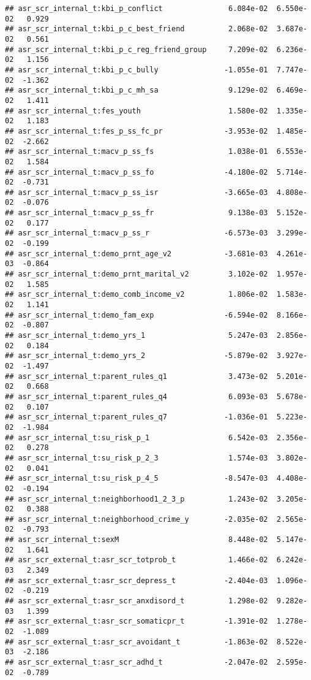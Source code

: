 \documentclass[
]{article}
\begin{document}
\begin{verbatim}
## asr_scr_internal_t:kbi_p_conflict               6.084e-02  6.550e-02   0.929
## asr_scr_internal_t:kbi_p_c_best_friend          2.068e-02  3.687e-02   0.561
## asr_scr_internal_t:kbi_p_c_reg_friend_group     7.209e-02  6.236e-02   1.156
## asr_scr_internal_t:kbi_p_c_bully               -1.055e-01  7.747e-02  -1.362
## asr_scr_internal_t:kbi_p_c_mh_sa                9.129e-02  6.469e-02   1.411
## asr_scr_internal_t:fes_youth                    1.580e-02  1.335e-02   1.183
## asr_scr_internal_t:fes_p_ss_fc_pr              -3.953e-02  1.485e-02  -2.662
## asr_scr_internal_t:macv_p_ss_fs                 1.038e-01  6.553e-02   1.584
## asr_scr_internal_t:macv_p_ss_fo                -4.180e-02  5.714e-02  -0.731
## asr_scr_internal_t:macv_p_ss_isr               -3.665e-03  4.808e-02  -0.076
## asr_scr_internal_t:macv_p_ss_fr                 9.138e-03  5.152e-02   0.177
## asr_scr_internal_t:macv_p_ss_r                 -6.573e-03  3.299e-02  -0.199
## asr_scr_internal_t:demo_prnt_age_v2            -3.681e-03  4.261e-03  -0.864
## asr_scr_internal_t:demo_prnt_marital_v2         3.102e-02  1.957e-02   1.585
## asr_scr_internal_t:demo_comb_income_v2          1.806e-02  1.583e-02   1.141
## asr_scr_internal_t:demo_fam_exp                -6.594e-02  8.166e-02  -0.807
## asr_scr_internal_t:demo_yrs_1                   5.247e-03  2.856e-02   0.184
## asr_scr_internal_t:demo_yrs_2                  -5.879e-02  3.927e-02  -1.497
## asr_scr_internal_t:parent_rules_q1              3.473e-02  5.201e-02   0.668
## asr_scr_internal_t:parent_rules_q4              6.093e-03  5.678e-02   0.107
## asr_scr_internal_t:parent_rules_q7             -1.036e-01  5.223e-02  -1.984
## asr_scr_internal_t:su_risk_p_1                  6.542e-03  2.356e-02   0.278
## asr_scr_internal_t:su_risk_p_2_3                1.574e-03  3.802e-02   0.041
## asr_scr_internal_t:su_risk_p_4_5               -8.547e-03  4.408e-02  -0.194
## asr_scr_internal_t:neighborhood1_2_3_p          1.243e-02  3.205e-02   0.388
## asr_scr_internal_t:neighborhood_crime_y        -2.035e-02  2.565e-02  -0.793
## asr_scr_internal_t:sexM                         8.448e-02  5.147e-02   1.641
## asr_scr_external_t:asr_scr_totprob_t            1.466e-02  6.242e-03   2.349
## asr_scr_external_t:asr_scr_depress_t           -2.404e-03  1.096e-02  -0.219
## asr_scr_external_t:asr_scr_anxdisord_t          1.298e-02  9.282e-03   1.399
## asr_scr_external_t:asr_scr_somaticpr_t         -1.391e-02  1.278e-02  -1.089
## asr_scr_external_t:asr_scr_avoidant_t          -1.863e-02  8.522e-03  -2.186
## asr_scr_external_t:asr_scr_adhd_t              -2.047e-02  2.595e-02  -0.789

\end{verbatim}
\end{document}
